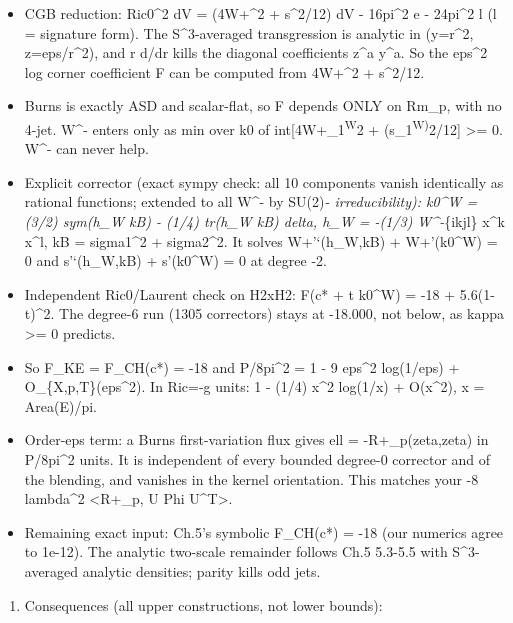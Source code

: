 \documentclass[
  10pt,
]{report}
\providecommand{\tightlist}{%
  \setlength{\itemsep}{0pt}\setlength{\parskip}{0pt}}
\begin{document}
\begin{itemize}
\tightlist
\item
  CGB reduction: \textbar Ric0\textbar\^{}2 dV =
  (4\textbar W+\textbar\^{}2 + s\^{}2/12) dV - 16pi\^{}2 e - 24pi\^{}2 l
  (l = signature form). The S\^{}3-averaged transgression is analytic in
  (y=r\^{}2, z=eps/r\^{}2), and r d/dr kills the diagonal coefficients
  z\^{}a y\^{}a. So the eps\^{}2 log corner coefficient F can be
  computed from 4\textbar W+\textbar\^{}2 + s\^{}2/12.
\item
  Burns is exactly ASD and scalar-flat, so F depends ONLY on Rm\_p, with
  no 4-jet. W\^{}- enters only as min over k0 of
  int{[}4\textbar W+\_1\textsuperscript{W\textbar{}}2 +
  (s\_1\textsuperscript{W)}2/12{]} \textgreater= 0. W\^{}- can never
  help.
\item
  Explicit corrector (exact sympy check: all 10 components vanish
  identically as rational functions; extended to all W\^{}- by
  SU(2)\emph{- irreducibility): k0\^{}W = (3/2) sym(h\_W kB) - (1/4)
  tr(h\_W kB) delta, h\_W = -(1/3) W\^{}-}\{ikjl\} x\^{}k x\^{}l, kB =
  sigma1\^{}2 + sigma2\^{}2. It solves W+'`(h\_W,kB) + W+'(k0\^{}W) = 0
  and s'`(h\_W,kB) + s'(k0\^{}W) = 0 at degree -2.
\item
  Independent Ric0/Laurent check on H2xH2: F(c* + t k0\^{}W) = -18 +
  5.6(1-t)\^{}2. The degree-6 run (1305 correctors) stays at -18.000,
  not below, as kappa \textgreater= 0 predicts.
\item
  So F\_KE = F\_CH(c*) = -18 and P/8pi\^{}2 = 1 - 9 eps\^{}2 log(1/eps)
  + O\_\{X,p,T\}(eps\^{}2). In Ric=-g units: 1 - (1/4) x\^{}2 log(1/x) +
  O(x\^{}2), x = Area(E)/pi.
\item
  Order-eps term: a Burns first-variation flux gives ell =
  -R+\_p(zeta,zeta) in P/8pi\^{}2 units. It is independent of every
  bounded degree-0 corrector and of the blending, and vanishes in the
  kernel orientation. This matches your -8 lambda\^{}2 \textless R+\_p,
  U Phi U\^{}T\textgreater.
\item
  Remaining exact input: Ch.5's symbolic F\_CH(c*) = -18 (our numerics
  agree to 1e-12). The analytic two-scale remainder follows Ch.5 5.3-5.5
  with S\^{}3-averaged analytic densities; parity kills odd jets.
\end{itemize}

\begin{enumerate}
\def\labelenumi{(\arabic{enumi})}
\setcounter{enumi}{1}
\tightlist
\item
  Consequences (all upper constructions, not lower bounds):
\end{enumerate}
\end{document}

